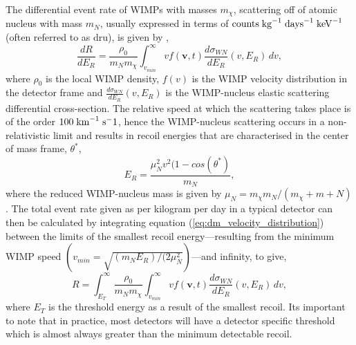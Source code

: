 The differential event rate of WIMPs with masses $m_{\chi}$, scattering off of atomic nucleus with mass $m_{N}$, usually expressed in terms of $\text{counts} \; \text{kg}^{-1} \; \text{days}^{-1} \; \text{keV}^{-1}$ (often referred to as dru), is given by \cite{Bertone_book},
%
\begin{equation} \label{eq:dm_velocity_distribution}
    \frac{dR}{dE_{R}} = \frac{\rho_{0}}{m_{N} m_{\chi}} \int_{v_{min}}^{\infty} vf(\boldsymbol{v}, t) \frac{d\sigma_{WN}}{dE_{R}}(v, E_{R}) \, dv, 
\end{equation}
%
where $\rho_{0}$ is the local WIMP density, $f(v)$ is the WIMP velocity distribution in the detector frame and $\frac{d\sigma_{WN}}{dE_{R}}(v, E_{R})$ is the WIMP-nucleus elastic scattering differential cross-section. The relative speed at which the scattering takes place is of the order $100 \; \text{km}^{-1} \; \text{s}^-1$, hence the WIMP-nucleus scattering occurs in a non-relativistic limit and results in recoil energies that are characterised in the center of mass frame, $\theta^{\ast}$,
%
\begin{equation} \label{eq:cm_wimp_energy}
    E_{R} = \frac{\mu^{2}_{N}v^{2}(1-cos(\theta^{\ast})}{m_{N}},
\end{equation}
%
where the reduced WIMP-nucleus mass is given by $\mu_{N} = m_{\chi}m_{N}/(m_{\chi} + m+{N})$. The total event rate given as per kilogram per day in a typical detector can then be calculated by integrating equation (\ref{eq:dm_velocity_distribution}) between the limits of the smallest recoil energy---resulting from the minimum WIMP speed $(v_{min} = \sqrt{(m_{N}E_{R})/(2\mu^{2}_{N}})$---and infinity, to give, 
%
\begin{equation} \label{eq:dm_velocity_distribution}
    R = \int_{E_{T}}^{\infty} \frac{\rho_{0}}{m_{N} m_{\chi}} \int_{v_{min}}^{\infty} vf(\boldsymbol{v}, t) \frac{d\sigma_{WN}}{dE_{R}}(v, E_{R}) \, dv, 
\end{equation}
%
where $E_{T}$ is the threshold energy as a result of the smallest recoil. Its important to note that in practice, most detectors will have a detector specific threshold which is almost always greater than the minimum detectable recoil. 

